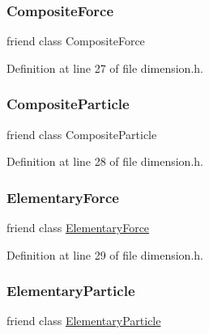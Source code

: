 \subsubsection{\texorpdfstring{Composite\+Force}{CompositeForce}}
{\footnotesize\ttfamily friend class Composite\+Force\hspace{0.3cm}{\ttfamily [friend]}}



Definition at line 27 of file dimension.\+h.

\mbox{\label{class_dimension_a8be5cf46db5f9876c49d58e4ab84044b}} 
\subsubsection{\texorpdfstring{Composite\+Particle}{CompositeParticle}}
{\footnotesize\ttfamily friend class Composite\+Particle\hspace{0.3cm}{\ttfamily [friend]}}



Definition at line 28 of file dimension.\+h.

\mbox{\label{class_dimension_a6e57500586e9cd366f5cf76ea0299957}} 
\subsubsection{\texorpdfstring{Elementary\+Force}{ElementaryForce}}
{\footnotesize\ttfamily friend class \mbox{\hyperlink{class_elementary_force}{Elementary\+Force}}\hspace{0.3cm}{\ttfamily [friend]}}



Definition at line 29 of file dimension.\+h.

\mbox{\label{class_dimension_af2ace341c1d7ccd30de3502502773591}} 
\subsubsection{\texorpdfstring{Elementary\+Particle}{ElementaryParticle}}
{\footnotesize\ttfamily friend class \mbox{\hyperlink{class_elementary_particle}{Elementary\+Particle}}\hspace{0.3cm}{\ttfamily [friend]}}




